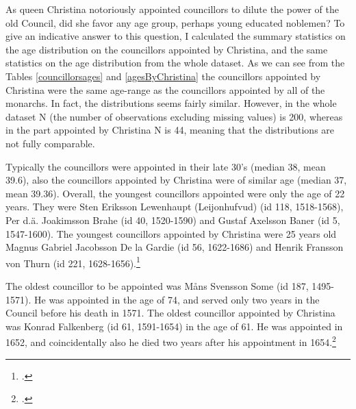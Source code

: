 As queen Christina notoriously appointed councillors to dilute the power of the old Council, did she favor any age group, perhaps young educated noblemen? To give an indicative answer to this question, I calculated the summary statistics on the age distribution on the councillors appointed by Christina, and the same statistics on the age distribution from the whole dataset. As we can see from the Tables \ref{councillorsages} and \ref{agesByChristina} the councillors appointed by Christina were the same age-range as the councillors appointed by all of the monarchs. In fact, the distributions seems fairly similar. However, in the whole dataset N (the number of observations excluding missing values) is 200, whereas in the part appointed by Christina N is 44, meaning that the distributions are not fully comparable.

Typically the councillors were appointed in their late 30's (median 38, mean 39.6), also the councillors appointed by Christina were of similar age (median 37, mean 39.36). Overall, the youngest councillors appointed were only the age of 22 years. They were Sten Eriksson Lewenhaupt (Leijonhufvud) (id 118, 1518-1568), Per d.ä. Joakimsson Brahe (id 40, 1520-1590) and Gustaf Axelsson Baner (id 5, 1547-1600). The youngest councillors appointed by Christina were 25 years old Magnus Gabriel Jacobsson De la Gardie (id 56, 1622-1686) and Henrik Fransson von Thurn (id 221, 1628-1656).\footcite{councillorsDS}

The oldest councillor to be appointed was Måns Svensson Some (id 187, 1495-1571). He was appointed in the age of 74, and served only two years in the Council before his death in 1571. The oldest councillor appointed by Christina was Konrad Falkenberg (id 61, 1591-1654) in the age of 61. He was appointed in 1652, and coincidentally also he died two years after his appointment in 1654.\footcite{councillorsDS} 

